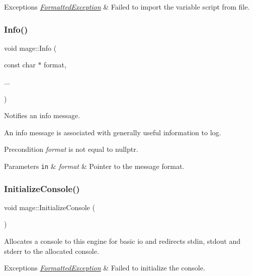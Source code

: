 \begin{DoxyExceptions}{Exceptions}
{\em \hyperlink{structmage_1_1_formatted_exception}{Formatted\+Exception}} & Failed to import the variable script from file. \\
\hline
\end{DoxyExceptions}
\hypertarget{namespacemage_add6aa5f13960ce07b20f48d273956a91}{}\label{namespacemage_add6aa5f13960ce07b20f48d273956a91} 
\subsubsection{\texorpdfstring{Info()}{Info()}}
{\footnotesize\ttfamily void mage\+::\+Info (\begin{DoxyParamCaption}\item[{const char $\ast$}]{format,  }\item[{}]{... }\end{DoxyParamCaption})}

Notifies an info message.

An info message is associated with generally useful information to log.

\begin{DoxyPrecond}{Precondition}
{\itshape format} is not equal to {\ttfamily nullptr}. 
\end{DoxyPrecond}

\begin{DoxyParams}[1]{Parameters}
\mbox{\tt in}  & {\em format} & Pointer to the message format. \\
\hline
\end{DoxyParams}
\hypertarget{namespacemage_a587146c8cbeed655be16ddff8435c05c}{}\label{namespacemage_a587146c8cbeed655be16ddff8435c05c} 
\subsubsection{\texorpdfstring{Initialize\+Console()}{InitializeConsole()}}
{\footnotesize\ttfamily void mage\+::\+Initialize\+Console (\begin{DoxyParamCaption}{ }\end{DoxyParamCaption})}

Allocates a console to this engine for basic io and redirects stdin, stdout and stderr to the allocated console.


\begin{DoxyExceptions}{Exceptions}
{\em \hyperlink{structmage_1_1_formatted_exception}{Formatted\+Exception}} & Failed to initialize the console. \\
\hline
\end{DoxyExceptions}
\hypertarget{namespacemage_a13b912f3dcd9c202fe3f9edb424e3b78}{}\label{namespacemage_a13b912f3dcd9c202fe3f9edb424e3b78} 
